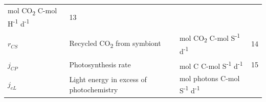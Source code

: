 \documentclass[]{elsarticle} %
\begin{document}
\begin{longtable}[c]{@{}llll@{}}
\begin{minipage}[t]{0.27\columnwidth}\raggedright\strut
mol CO\textsubscript{2} C-mol H\textsuperscript{-1}
d\textsuperscript{-1}
\strut\end{minipage} &
\begin{minipage}[t]{0.10\columnwidth}\raggedright\strut
13
\strut\end{minipage}\tabularnewline
\begin{minipage}[t]{0.10\columnwidth}\raggedright\strut
\(r_{CS}\)
\strut\end{minipage} &
\begin{minipage}[t]{0.45\columnwidth}\raggedright\strut
Recycled CO\textsubscript{2} from symbiont
\strut\end{minipage} &
\begin{minipage}[t]{0.27\columnwidth}\raggedright\strut
mol CO\textsubscript{2} C-mol S\textsuperscript{-1}
d\textsuperscript{-1}
\strut\end{minipage} &
\begin{minipage}[t]{0.10\columnwidth}\raggedright\strut
14
\strut\end{minipage}\tabularnewline
\begin{minipage}[t]{0.10\columnwidth}\raggedright\strut
\(j_{CP}\)
\strut\end{minipage} &
\begin{minipage}[t]{0.45\columnwidth}\raggedright\strut
Photosynthesis rate
\strut\end{minipage} &
\begin{minipage}[t]{0.27\columnwidth}\raggedright\strut
mol C C-mol S\textsuperscript{-1} d\textsuperscript{-1}
\strut\end{minipage} &
\begin{minipage}[t]{0.10\columnwidth}\raggedright\strut
15
\strut\end{minipage}\tabularnewline
\begin{minipage}[t]{0.10\columnwidth}\raggedright\strut
\(j_{eL}\)
\strut\end{minipage} &
\begin{minipage}[t]{0.45\columnwidth}\raggedright\strut
Light energy in excess of photochemistry
\strut\end{minipage} &
\begin{minipage}[t]{0.27\columnwidth}\raggedright\strut
mol photons C-mol S\textsuperscript{-1} d\textsuperscript{-1}
\strut\end{minipage} &
\begin{minipage}[t]{0.10\columnwidth}\raggedright\strut

\end{minipage}
\end{longtable}
\end{document}
